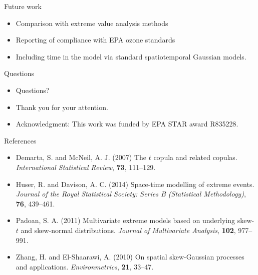 \documentclass{beamer}
\begin{document}
\begin{frame}{Future work}
  \begin{itemize} \setlength{\itemsep}{0.5em}
    \item Comparison with extreme value analysis methods
    \item Reporting of compliance with EPA ozone standards
    \item Including time in the model via standard spatiotemporal Gaussian models.  
  \end{itemize}
\end{frame}

\begin{frame}{Questions}
  \begin{itemize} \setlength{\itemsep}{0.5em}
    \item Questions?
    \item Thank you for your attention.
    \item Acknowledgment: This work was funded by EPA STAR award R835228.
  \end{itemize}
\end{frame}

\begin{frame}{References}
  \begin{itemize} \setlength{\itemsep}{0.5em}
    \item Demarta, S. and McNeil, A. J. (2007) The $t$ copula and related copulas. {\it International Statistical Review}, {\bf 73}, 111--129.
    \item Huser, R. and Davison, A. C. (2014) Space-time modelling of extreme events. {\it Journal of the Royal Statistical Society: Series B (Statistical Methodology)}, {\bf 76}, 439--461.
    \item Padoan, S. A. (2011) Multivariate extreme models based on underlying skew-$t$ and skew-normal distributions. {\it Journal of Multivariate Analysis}, {\bf 102}, 977--991.
    \item Zhang, H. and El-Shaarawi, A. (2010) On spatial skew-Gaussian processes and applications. {\it Environmetrics}, {\bf 21}, 33--47.
  \end{itemize}
\end{frame}
\end{document}
